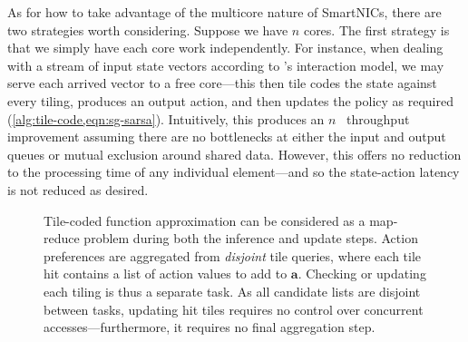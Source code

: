As for how to take advantage of the multicore nature of SmartNICs, there are two strategies worth considering.
Suppose we have $n$ cores.
The first strategy is that we simply have each core work independently.
For instance, when dealing with a stream of input state vectors according to \approachshort{}'s interaction model, we may serve each arrived vector to a free core---this then tile codes the state against every tiling, produces an output action, and then updates the policy as required (\cref{alg:tile-code,eqn:sg-sarsa}).
Intuitively, this produces an $n$~\unit{\times} throughput improvement assuming there are no bottlenecks at either the input and output queues or mutual exclusion around shared data.
However, this offers no reduction to the processing time of any individual element---and so the state-action latency is not reduced as desired.

\begin{figure}
	\centering
	\resizebox{0.67\linewidth}{!}{
		
	}
	\caption[A visualisation of how tile-coding can be split into subtasks as a map-reduce problem.]{Tile-coded function approximation can be considered as a map-reduce problem during both the inference and update steps. Action preferences are aggregated from \emph{disjoint} tile queries, where each tile hit contains a list of action values to add to $\mathbf{a}$. Checking or updating each tiling is thus a separate task. As all candidate lists are disjoint between tasks, updating hit tiles requires no control over concurrent accesses---furthermore, it requires no final aggregation step.\label{fig:opal-par-tilecode}}
\end{figure}

